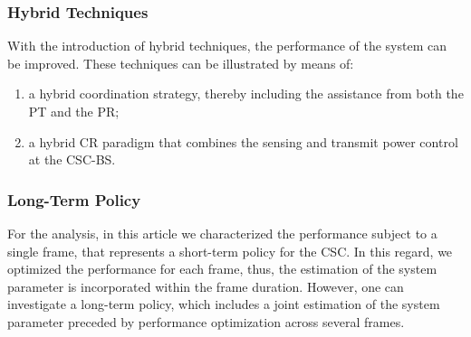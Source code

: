 \documentclass[draftcls, onecolumn, 11pt]{IEEEtran}
\begin{document}
 
\subsubsection*{Hybrid Techniques}
With the introduction of hybrid techniques, the performance of the system can be improved. These techniques can be illustrated by means of: 
\begin{enumerate}
\item a hybrid coordination strategy, thereby including the assistance from both the PT and the PR; 
\item a hybrid CR paradigm that combines the sensing and transmit power control at the CSC-BS. 
\end{enumerate}

\subsubsection*{Long-Term Policy}
For the analysis, in this article we characterized the performance subject to a single frame, that represents a short-term policy for the CSC. In this regard, we optimized the performance for each frame, thus, the estimation of the system parameter is incorporated within the frame duration. However, one can investigate a long-term policy, which includes a joint estimation of the system parameter preceded by performance optimization across several frames. 
\end{document}
